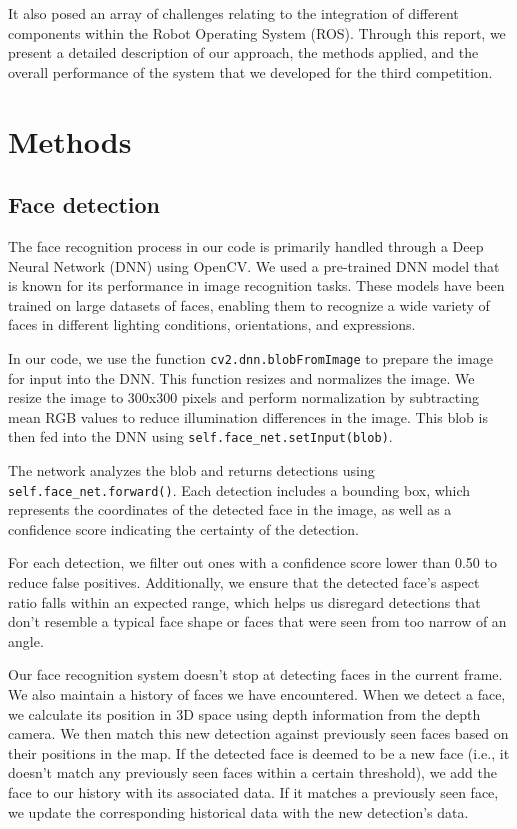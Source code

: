 \documentclass{article}
\begin{document}
It also posed an array of challenges relating to the integration of different components within the Robot Operating System (ROS). Through this report, we present a detailed description of our approach, the methods applied, and the overall performance of the system that we developed for the third competition.

\section{Methods}

\subsection{Face detection}
The face recognition process in our code is primarily handled through a Deep Neural Network (DNN) using OpenCV. We used a pre-trained DNN model that is known for its performance in image recognition tasks. These models have been trained on large datasets of faces, enabling them to recognize a wide variety of faces in different lighting conditions, orientations, and expressions.

In our code, we use the function \texttt{cv2.dnn.blobFromImage} to prepare the image for input into the DNN. This function resizes and normalizes the image. We resize the image to 300x300 pixels and perform normalization by subtracting mean RGB values to reduce illumination differences in the image. This blob is then fed into the DNN using \texttt{self.face\_net.setInput(blob)}.

The network analyzes the blob and returns detections using \texttt{self.face\_net.forward()}. Each detection includes a bounding box, which represents the coordinates of the detected face in the image, as well as a confidence score indicating the certainty of the detection.

For each detection, we filter out ones with a confidence score lower than 0.50 to reduce false positives. Additionally, we ensure that the detected face's aspect ratio falls within an expected range, which helps us disregard detections that don't resemble a typical face shape or faces that were seen from too narrow of an angle.

Our face recognition system doesn't stop at detecting faces in the current frame. We also maintain a history of faces we have encountered. When we detect a face, we calculate its position in 3D space using depth information from the depth camera. We then match this new detection against previously seen faces based on their positions in the map. If the detected face is deemed to be a new face (i.e., it doesn't match any previously seen faces within a certain threshold), we add the face to our history with its associated data. If it matches a previously seen face, we update the corresponding historical data with the new detection's data.
\end{document}
